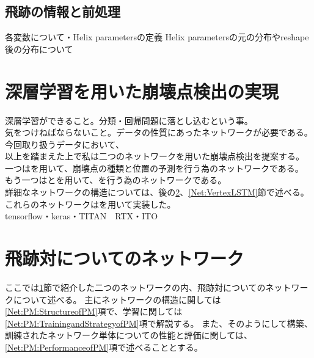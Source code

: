 \subsection{飛跡の情報と前処理} \label{Net:Data:TrackInformationandPreprocessing}

各変数について・Helix parametersの定義\cite{TrackParametersLCIO}
Helix parametersの元の分布やreshape後の分布について\\

\section{深層学習を用いた崩壊点検出の実現} \label{Net:forVertexFinderwithDL}

深層学習ができること。分類・回帰問題に落とし込むという事。\\
気をつけねばならないこと。データの性質にあったネットワークが必要である。今回取り扱うデータにおいて、\\

以上を踏まえた上で私は二つのネットワークを用いた崩壊点検出を提案する。\\
一つはを用いて、崩壊点の種類と位置の予測を行う為のネットワークである。\\
もう一つはとを用いて、を行う為のネットワークである。\\
詳細なネットワークの構造については、後の\ref{Net:PairModel}、\ref{Net:VertexLSTM}節で述べる。\\

これらのネットワークはを用いて実装した。\\
tensorflow・keras・TITAN　RTX・ITO\\


\section{飛跡対についてのネットワーク} \label{Net:PairModel}

ここでは\ref{Net:forVertexFinderwithDL}節で紹介した二つのネットワークの内、飛跡対についてのネットワークについて述べる。
主にネットワークの構造に関しては\ref{Net:PM:StructureofPM}項で、学習に関しては\ref{Net:PM:TrainingandStrategyofPM}項で解説する。
また、そのようにして構築、訓練されたネットワーク単体についての性能と評価に関しては、\ref{Net:PM:PerformanceofPM}項で述べることとする。

